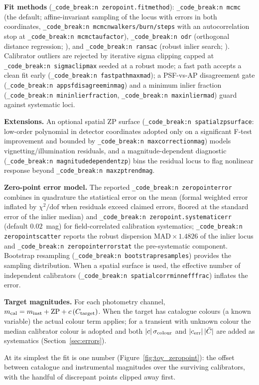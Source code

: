 \documentclass[11pt,a4paper]{article}
\renewcommand{\_}{\autophotunderscore\allowbreak}
\DeclareRobustCommand{\code}[1]{\texttt{\autophot_code_break:n {#1}}}
\begin{document}
\textbf{Fit methods} (\code{zeropoint.fit\_method}): \code{mcmc} (the
default; affine-invariant sampling of the locus with errors in both
coordinates, \code{mcmc\_n\_walkers/burn/steps} with an autocorrelation
stop at \code{mcmc\_tau\_factor}), \code{odr} (orthogonal distance
regression; \citealp{boggs1987odr}), and \code{ransac} (robust inlier
search; \citealp{fischler1981ransac}). Calibrator
outliers are rejected by iterative sigma clipping capped at
\code{sigma\_clip\_max} seeded at a robust mode; a fast path accepts a
clean fit early (\code{fast\_path\_max\_mad}); a PSF-vs-AP disagreement
gate (\code{ap\_psf\_disagree\_min\_mag}) and a minimum inlier fraction
(\code{min\_inlier\_fraction}, \code{max\_inlier\_mad}) guard against
systematic loci.

\textbf{Extensions.} An optional spatial ZP surface
(\code{spatial\_zp\_surface}: low-order polynomial in detector
coordinates adopted only on a significant F-test improvement and bounded
by \code{max\_correction\_mag}) models vignetting/illumination
residuals, and a magnitude-dependent diagnostic
(\code{magnitude\_dependent\_zp}) bins the residual locus to flag
nonlinear response beyond \code{max\_zp\_trend\_mag}.

\textbf{Zero-point error model.} The reported
\code{zeropoint\_error} combines in quadrature the statistical error on
the mean (formal weighted error inflated by $\chi^2/\mathrm{dof}$ when
residuals exceed claimed errors, floored at the standard error of the
inlier median) and \code{zeropoint.systematic\_err} (default $0.02$~mag)
for field-correlated calibration systematics;
\code{zeropoint\_scatter} reports the robust dispersion
$\mathrm{MAD}\times1.4826$ of the inlier locus and
\code{zeropoint\_error\_stat} the pre-systematic component. Bootstrap
resampling (\code{bootstrap\_resamples}) provides the sampling
distribution. When a spatial surface is used, the effective number of
independent calibrators (\code{spatial\_corr\_min\_neff\_frac}) inflates
the error.

\textbf{Target magnitudes.} For each photometry channel,
$m_{\rm cal}=m_{\rm inst}+\mathrm{ZP}+c\,(C_{\rm target})$. When the
target has catalogue colours (a known variable) the actual colour term
applies; for a transient with unknown colour the median calibrator colour
is adopted and both $|c|\,\sigma_{\rm colour}$ and
$|c_{\rm err}|\,|\bar{C}|$ are added as systematics
(Section~\ref{sec:errors}).

At its simplest the fit is one number
(Figure~\ref{fig:toy_zeropoint}): the offset between catalogue and
instrumental magnitudes over the surviving calibrators, with the
handful of discrepant points clipped away first.
\end{document}
